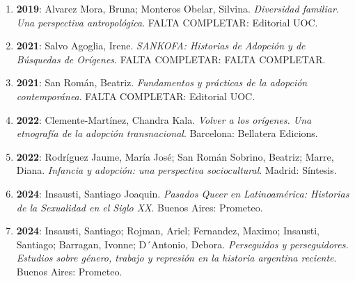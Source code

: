 \begin{enumerate}
\item {\bf 2019}: Alvarez Mora, Bruna; Monteros Obelar, Silvina. {\it Diversidad familiar. Una perspectiva antropológica}. FALTA COMPLETAR: Editorial UOC.\filbreak
\item {\bf 2021}: Salvo Agoglia, Irene. {\it SANKOFA: Historias de Adopción y de Búsquedas de Orígenes}. FALTA COMPLETAR: FALTA COMPLETAR.\filbreak
\item {\bf 2021}: San Román, Beatriz. {\it Fundamentos y prácticas de la adopción contemporánea}. FALTA COMPLETAR: Editorial UOC.\filbreak
\item {\bf 2022}: Clemente-Martínez, Chandra Kala. {\it Volver a los orígenes. Una etnografía de la adopción transnacional}. Barcelona: Bellatera Edicions.\filbreak
\item {\bf 2022}: Rodríguez Jaume, María José; San Román Sobrino, Beatriz; Marre, Diana. {\it Infancia y adopción: una perspectiva sociocultural}. Madrid: Síntesis.\filbreak
\item {\bf 2024}: Insausti, Santiago Joaquin. {\it Pasados Queer en Latinoamérica: Historias de la Sexualidad en el Siglo XX}. Buenos Aires: Prometeo.\filbreak
\item {\bf 2024}: Insausti, Santiago; Rojman, Ariel; Fernandez, Maximo; Insausti, Santiago; Barragan, Ivonne; D´Antonio, Debora. {\it Perseguidos y perseguidores.
Estudios sobre género, trabajo y represión en la historia argentina reciente}. Buenos Aires: Prometeo.\filbreak
\end{enumerate} 
